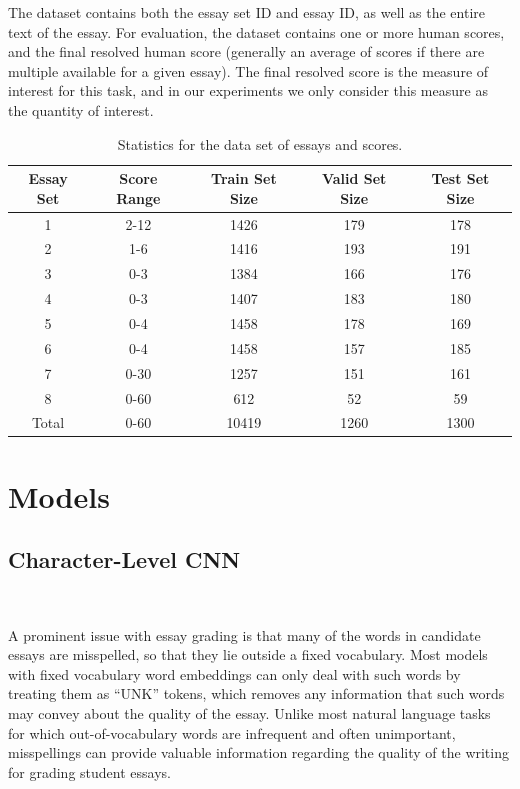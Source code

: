 \documentclass[10pt,psamsfonts]{amsart}
\theoremstyle{definition}
\theoremstyle{remark}
\numberwithin{equation}{section}
\begin{document}
The dataset contains both the essay set ID and essay ID, as well as the entire text of the essay. For evaluation, the dataset contains one or more human scores, and the final resolved human score (generally an average of scores if there are multiple available for a given essay). The final resolved score is the measure of interest for this task, and in our experiments we only consider this measure as the quantity of interest.

\begin{table}
	\begin{tabular}{c|c|c|c|c}
		Essay Set & Score Range & Train Set Size & Valid Set Size & Test Set Size\\\hline
		1 & 2-12 & 1426 & 179 & 178\\
		2 & 1-6 & 1416 & 193 & 191\\
		3 & 0-3 & 1384 & 166 & 176\\
		4 & 0-3 & 1407 & 183 & 180 \\
		5 & 0-4 & 1458 & 178 & 169\\
		6 & 0-4 & 1458 & 157 & 185\\
		7 & 0-30 & 1257 & 151 & 161\\ 
		8 & 0-60 & 612 & 52 & 59\\\hline
		Total & 0-60 & 10419 & 1260 & 1300
	\end{tabular}
	\caption{Statistics for the data set of essays and scores.}
	\label{fig:data}
\end{table}

\section*{Models}

\subsection*{Character-Level CNN}\hfill\\
\vskip -0.1in

A prominent issue with essay grading is that many of the words in candidate essays are misspelled, so that they lie outside a fixed vocabulary. Most models with fixed vocabulary word embeddings can only deal with such words by treating them as ``UNK'' tokens, which removes any information that such words may convey about the quality of the essay. Unlike most natural language tasks for which out-of-vocabulary words are infrequent and often unimportant, misspellings can provide valuable information regarding the quality of the writing for grading student essays.
\end{document}
